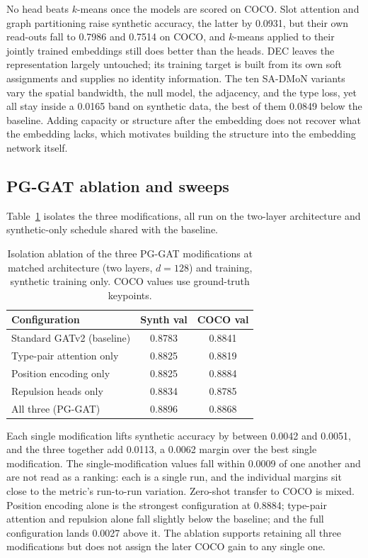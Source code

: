 No head beats $k$-means once the models are scored on COCO.
Slot attention and graph partitioning raise synthetic accuracy, the latter by 0.0931,
but their own read-outs fall to 0.7986 and 0.7514 on COCO,
and $k$-means applied to their jointly trained embeddings still does better than the heads.
DEC leaves the representation largely untouched; its training target is built from its own soft assignments and supplies no identity information.
The ten SA-DMoN variants vary the spatial bandwidth, the null model, the adjacency, and the type loss,
yet all stay inside a 0.0165 band on synthetic data, the best of them 0.0849 below the baseline.
Adding capacity or structure after the embedding does not recover what the embedding lacks, which motivates building the structure into the embedding network itself.

\subsection{PG-GAT ablation and sweeps}
\label{sec:results_ablation}

Table~\ref{tab:ablation} isolates the three modifications, all run on the two-layer architecture
and synthetic-only schedule shared with the baseline.

\begin{table}[!t]
\centering
\caption{Isolation ablation of the three PG-GAT modifications at matched architecture (two layers, $d=128$) and training, synthetic training only.
COCO values use ground-truth keypoints.}
\label{tab:ablation}
\footnotesize\setlength{\tabcolsep}{3.5pt}
\begin{tabular}{lcc}
\toprule
Configuration & Synth val & COCO val \\
\midrule
Standard GATv2 (baseline) & 0.8783 & 0.8841 \\
Type-pair attention only & 0.8825 & 0.8819 \\
Position encoding only & 0.8825 & 0.8884 \\
Repulsion heads only & 0.8834 & 0.8785 \\
All three (PG-GAT) & 0.8896 & 0.8868 \\
\bottomrule
\end{tabular}
\end{table}

Each single modification lifts synthetic accuracy by between 0.0042 and 0.0051, and the three together add 0.0113,
a 0.0062 margin over the best single modification.
The single-modification values fall within 0.0009 of one another and are not read as a ranking:
each is a single run, and the individual margins sit close to the metric's run-to-run variation.
Zero-shot transfer to COCO is mixed.
Position encoding alone is the strongest configuration at 0.8884;
type-pair attention and repulsion alone fall slightly below the baseline;
and the full configuration lands 0.0027 above it.
The ablation supports retaining all three modifications but does not assign the later COCO gain to any single one.

